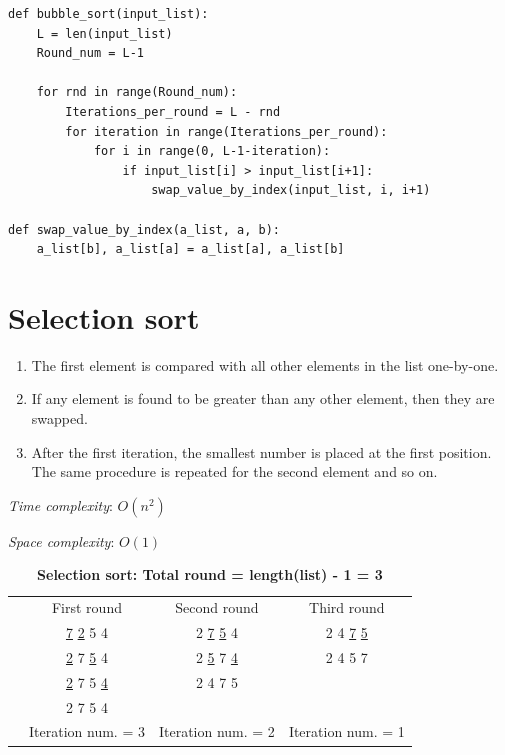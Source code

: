 \documentclass[a4paper,11pt]{book}
\begin{document}
% 
\begin{lstlisting}
def bubble_sort(input_list):
	L = len(input_list)
	Round_num = L-1

	for rnd in range(Round_num):
		Iterations_per_round = L - rnd
		for iteration in range(Iterations_per_round):
			for i in range(0, L-1-iteration):
				if input_list[i] > input_list[i+1]:
					swap_value_by_index(input_list, i, i+1)

def swap_value_by_index(a_list, a, b):
    a_list[b], a_list[a] = a_list[a], a_list[b]
\end{lstlisting}

\newpage
\section{Selection sort}

\begin{enumerate}
	\item The first element is compared with all other elements in the list one-by-one.
	\item If any element is found to be greater than any other element, then they are swapped.
	\item After the first iteration, the smallest number is placed at the first position. The same procedure is repeated for the second element and so on.
\end{enumerate}

\noindent \textit{Time complexity}: $O(n^2)$

\noindent \textit{Space complexity}: $O(1)$

\begin{table}[h]
	\label{Selection sort}
	\caption{\textbf{Selection sort: Total round = length(list) - 1 = 3}}
	\vspace{2mm}
	\centering
	\begin{tabular}{cccc}
		&{First round}  &{Second round}  &{Third round}   \\
		&\underline{7} \underline{2} 5 4  &2 \underline{7} \underline{5} 4 &2 4 \underline{7} \underline{5}   \\
		&\underline{2} 7 \underline{5} 4 &2 \underline{5} 7 \underline{4}  &2 4 5 7   \\
		&\underline{2} 7 5 \underline{4}  &2 4 7 5 &   \\
		&2 7 5 4  & &\\
		&Iteration num. = 3 &Iteration num. = 2 &Iteration num. = 1 
	\end{tabular}
\end{table}
\end{document}

